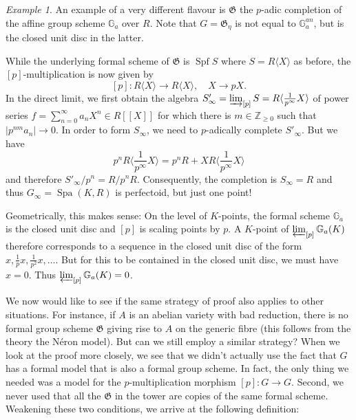 \documentclass[11pt,oneside]{amsart}
\theoremstyle{definition}
\theoremstyle{remark}
\newtheorem*{example}{Example}
\begin{document}
	\begin{example}
		An example of a very different flavour is $\mathfrak G$ the $p$-adic completion of the affine group scheme $\mathbb G_a$ over $R$. Note that $G=\mathfrak G_\eta$ is not equal to $\mathbb G_a^{an}$, but is the closed unit disc in the latter.
		
		While the underlying formal scheme of $\mathfrak G$ is $\operatorname {Spf} S$ where $S=R\langle X \rangle$ as before, the $[p]$-multiplication is now given by
		\[[p]:R\langle X \rangle\rightarrow  R\langle X \rangle, \quad X\rightarrow pX.\]
		In the direct limit, we first obtain the algebra $S'_\infty = \varinjlim_{[p]} S = R\langle \frac{1}{p^\infty}X \rangle$ of power series $f=\sum_{n=0}^\infty  a_nX^n\in R[[X]]$ for which there is $m\in \mathbb Z_{\geq 0}$ such that $|p^{nm}a_n|\to 0$. In order to form $S_\infty$, we need to $p$-adically complete $S'_\infty$. But we have 
		\[p^nR\langle \frac{1}{p^\infty}X \rangle = p^nR + X R\langle \frac{1}{p^\infty}X \rangle\]
		and therefore $S'_\infty/p^n=R/p^nR$. Consequently, the completion is $S_\infty = R$ and thus $G_\infty = \operatorname{Spa}(K,R)$ is perfectoid, but just one point!
		
		Geometrically, this makes sense: On the level of $K$-points, the formal scheme $\mathbb G_a$ is the closed unit disc and $[p]$ is scaling points by $p$. A $K$-point of $\varprojlim_{[p]} \mathbb G_a(K)$ therefore corresponds to a sequence in the closed unit disc of the form $x,\frac{1}{p}x,\frac{1}{p^2}x,\dots$. But for this to be contained in the closed unit disc, we must have $x=0$. Thus $\varprojlim_{[p]} \mathbb G_a(K)=0$.
		
	\end{example}
	
	We now would like to see if the same strategy of proof also applies to other situations. For instance, if $A$ is an abelian variety with bad reduction, there is no formal group scheme $\mathfrak G$ giving rise to $A$ on the generic fibre (this follows from the theory the N\'eron model). But can we still employ a similar strategy? When we look at the proof more closely, we see that we didn't actually use the fact that $G$ has a formal model that is also a formal group scheme. In fact, the only thing we needed was a model for the $p$-multiplication morphism $[p]:G\rightarrow G$. Second, we never used that all the $\mathfrak G$ in the tower are copies of the same formal scheme. Weakening these two conditions, we arrive at the following definition:
	
\end{document}
